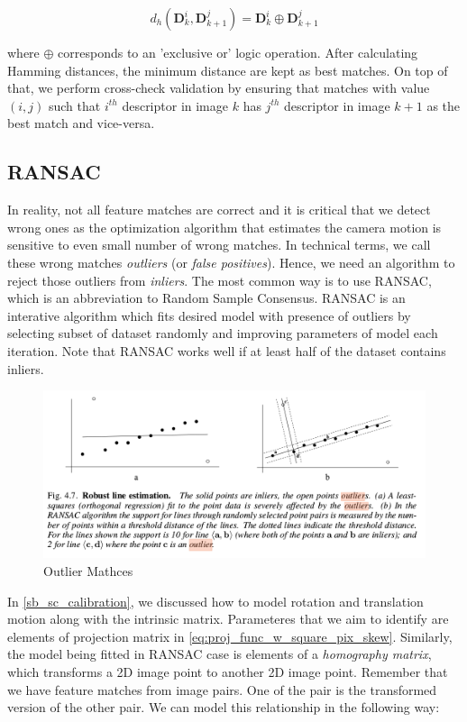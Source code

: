 \documentclass[a4paper]{report}
\numberwithin{figure}{section}
\begin{document}
\begin{equation}
  d_h(\mathbf{D}_{k}^i,\mathbf{D}_{k+1}^j) = \mathbf{D}_{k}^i \oplus \mathbf{D}_{k+1}^j
\end{equation}

where $\oplus$ corresponds to an 'exclusive or' logic operation. After calculating 
Hamming distances, the minimum distance are kept as best matches. On top of that, 
we perform cross-check validation by ensuring that
matches with value $(i,j)$ such that $i^{th}$ descriptor in image $k$ 
has $j^{th}$ descriptor in image $k+1$ as the best match and vice-versa.


\subsection{RANSAC} \label{sb_sc_ransac}

In reality, not all feature matches are correct and it is critical that we 
detect wrong ones as the optimization algorithm that estimates the camera 
motion is sensitive to even small number of wrong matches. In technical terms,
we call these 
wrong matches \textit{outliers} (or \textit{false positives}). Hence, 
we need an algorithm to reject those outliers from \textit{inliers}. 
The most common way is to use RANSAC, which is an abbreviation to 
Random Sample Consensus. RANSAC is an interative algorithm which 
fits desired model with presence of outliers by selecting subset of dataset 
randomly and improving parameters of model each iteration. Note that 
RANSAC works 
well if at least half of the dataset contains inliers. 

\begin{figure}[H]
	\centering
	\includegraphics[width=\linewidth,natwidth=640,natheight=640]
  {fig/ref_imgs/line_ransac_outlier.png}
  \caption{Outlier Mathces}
	\label{fig:outlier_matches}
\end{figure}

In \ref{sb_sc_calibration}, we discussed how to model rotation and translation 
motion along with the intrinsic matrix. Parameteres that we aim to 
identify are elements of projection matrix in \ref{eq:proj_func_w_square_pix_skew}. 
Similarly, the model being fitted in RANSAC case is elements of a 
\textit{homography matrix}, 
which transforms a 2D image point to another 2D image point.
Remember that we have feature matches from image pairs. One of the pair is 
the transformed version of the other pair. 
We can model this relationship in the following way:
\end{document}
